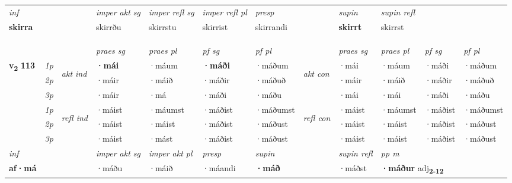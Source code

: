 \begin{longtable}[l]{X>{\footnotesize\itshape}llXXXXlXXXX}
   {\textit{inf}} & &  & \textit{imper akt sg}  & \textit{imper refl sg} & \textit{imper refl pl} & \textit{presp} && \textit{supin} & \textit{supin refl}  \\*
  {\textbf{skirra}} & && skirrðu   & skirrstu & skirrist & skirrandi &&  \textbf{skirrt} & skirrst  \\*

\midrule
 & \\*
   & \\*
  & \\
   \midrule
 & &   & \textit{praes sg}  & \textit{praes pl}    & \textit{ pf sg} & \textit{pf pl} & & \textit{praes sg}  & \textit{praes pl}    & \textit{pf sg} & \textit{pf pl }  \\ \cmidrule{4-7} \cmidrule{9-12}
 \multirow{2}{*}{{{\textbf{v{\textsubscript{2}}} \Large{\textbf{113}}}}}  & 1p & \multirow{3}{*}{\begin{turn}{90}\textit{akt ind}\end{turn}} & \textbf{·mái} & ·máum & \textbf{·máði} & ·máðum & \multirow{3}{*}{\begin{turn}{90}\textit{akt con}\end{turn}} &·mái & ·máum & ·máði & ·máðum\\*
 & 2p &  &  ·máir  & ·máið & ·máðir & ·máðuð & & ·máir & ·máið & ·máðir & ·máðuð \\*
 & 3p &  & ·máir & ·má & ·máði & ·máðu & & ·mái & ·mái& ·máði & ·máðu \\*
\cmidrule{4-7} \cmidrule{9-12}
 & 1p & \multirow{3}{*}{\begin{turn}{90}\textit{refl ind}\end{turn}}  & ·máist & ·máumst & ·máðist & ·máðumst & \multirow{3}{*}{\begin{turn}{90}\textit{refl con}\end{turn}}  &·máist & ·máumst & ·máðist & ·máðumst \\*
 & 2p &  & ·máist & ·máist & ·máðist & ·máðust & &·máist & ·máist & ·máðist & ·máðust \\*
 & 3p  & & ·máist & ·mást & ·máðist & ·máðust & & ·máist & ·máist& ·máðist & ·máðust \\*
\cmidrule{4-7} \cmidrule{9-12}

   {\textit{inf}} & &  & \textit{imper akt sg} & \textit{imper akt pl}   & \textit{presp} & \textit{supin} && \textit{supin refl} & \textit{pp m} \\*
  {\textbf{af\allowbreak ·má}} & && ·máðu  & ·máið   & ·máandi &  \textbf{·máð} && ·máðst & \multicolumn{2}{l}{\textbf{·máður} adj\textbf{\textsubscript{2-12}}} \\*


\end{longtable}
